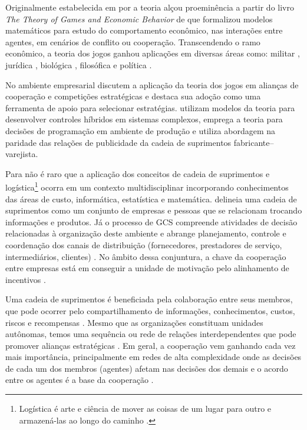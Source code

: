 \documentclass[
	article,			        %
	11pt,				          %
	oneside,			        %
	a4paper,			        %
	english,			        %
	brazil,				        %
	sumario=tradicional
]{abntex2}\usepackage[]{graphicx}\usepackage[]{color}
\begin{document}
Originalmente estabelecida em \citeyear{Cournot.1838} por  a teoria alçou proeminência a partir do livro \emph{The Theory of Games and Economic Behavior} de  que formalizou modelos matemáticos para estudo do comportamento econômico, nas interações entre agentes, em cenários de conflito ou cooperação. Transcendendo o ramo econômico, a teoria dos jogos ganhou aplicações em diversas áreas como: militar \cite{Haywood.1954,RAND.2004}, jurídica \cite{Rosa.2014}, biológica \cite{Smith.1982}, filosófica \cite{Lewis.2002} e política \cite{Levy.2003}. 

No ambiente empresarial  discutem a aplicação da teoria dos jogos em alianças de cooperação e competições estratégicas e  destaca sua adoção como uma ferramenta de apoio para selecionar estratégias.  utilizam modelos da teoria para desenvolver controles híbridos em sistemas complexos,  emprega a teoria para decisões de programação em ambiente de produção e  utiliza abordagem na paridade das relações de publicidade da cadeia de suprimentos fabricante--varejista.

Para  não é raro que a aplicação dos conceitos de cadeia de suprimentos e logística\footnote{Logística é arte e ciência de mover as coisas de um lugar para outro e armazená-las ao longo do caminho \cite[p.~370]{Fawcett.2000}.} ocorra em um contexto multidisciplinar incorporando conhecimentos das áreas de custo, informática, estatística e matemática.  delineia uma cadeia de suprimentos como um conjunto de empresas e pessoas que se relacionam trocando informações e produtos. Já o processo de GCS compreende atividades de decisão relacionadas à organização deste ambiente \cite{Fredendall.2001} e abrange planejamento, controle e coordenação dos canais de distribuição (fornecedores, prestadores de serviço, intermediários, clientes) \cite{Panitz.2007}. No âmbito dessa conjuntura, a chave da cooperação entre empresas está em conseguir a unidade de motivação pelo alinhamento de incentivos \cite{Cao.2012}. 

Uma cadeia de suprimentos é beneficiada pela colaboração entre seus membros, que pode ocorrer pelo compartilhamento de informações, conhecimentos, custos, riscos e recompensas \cite{Simatupang.2002}. Mesmo que as organizações constituam unidades autônomas, temos uma sequência ou rede de relações interdependentes que pode promover alianças estratégicas \cite{Chen.2004}. Em geral, a cooperação vem ganhando cada vez mais importância, principalmente em redes de alta complexidade \cite{Drechsel.2010} onde as decisões de cada um dos membros (agentes) afetam nas decisões dos demais e o acordo entre os agentes é a base da cooperação \cite{Young.1994}.
\end{document}

